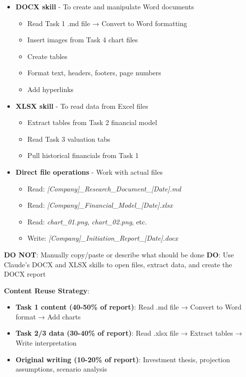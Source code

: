 \documentclass[11pt]{article}
\begin{document}
\begin{itemize}[leftmargin=*,itemsep=2pt,topsep=2pt]
\item {} \textbf{DOCX skill} - To create and manipulate Word documents
\begin{itemize}[leftmargin=*,itemsep=2pt,topsep=2pt]
\item {} Read Task 1 .md file → Convert to Word formatting
\item {} Insert images from Task 4 chart files
\item {} Create tables
\item {} Format text, headers, footers, page numbers
\item {} Add hyperlinks
\end{itemize}
\item {} \textbf{XLSX skill} - To read data from Excel files
\begin{itemize}[leftmargin=*,itemsep=2pt,topsep=2pt]
\item {} Extract tables from Task 2 financial model
\item {} Read Task 3 valuation tabs
\item {} Pull historical financials from Task 1
\end{itemize}
\item {} \textbf{Direct file operations} - Work with actual files
\begin{itemize}[leftmargin=*,itemsep=2pt,topsep=2pt]
\item {} Read: \emph{[Company]\_\allowbreak{}Research\_\allowbreak{}Document\_\allowbreak{}[Date].md}
\item {} Read: \emph{[Company]\_\allowbreak{}Financial\_\allowbreak{}Model\_\allowbreak{}[Date].xlsx}
\item {} Read: \emph{chart\_\allowbreak{}01.png}, \emph{chart\_\allowbreak{}02.png}, etc.
\item {} Write: \emph{[Company]\_\allowbreak{}Initiation\_\allowbreak{}Report\_\allowbreak{}[Date].docx}
\end{itemize}
\end{itemize}

\textbf{DO NOT}: Manually copy/paste or describe what should be done \textbf{DO}: Use Claude's DOCX and XLSX skills to open files, extract data, and create the DOCX report


\textbf{Content Reuse Strategy}:

\begin{itemize}[leftmargin=*,itemsep=2pt,topsep=2pt]
\item {} \textbf{Task 1 content (40-50\% of report)}: Read .md file → Convert to Word format → Add charts
\item {} \textbf{Task 2/3 data (30-40\% of report)}: Read .xlsx file → Extract tables → Write interpretation
\item {} \textbf{Original writing (10-20\% of report)}: Investment thesis, projection assumptions, scenario analysis
\end{itemize}
\end{document}
